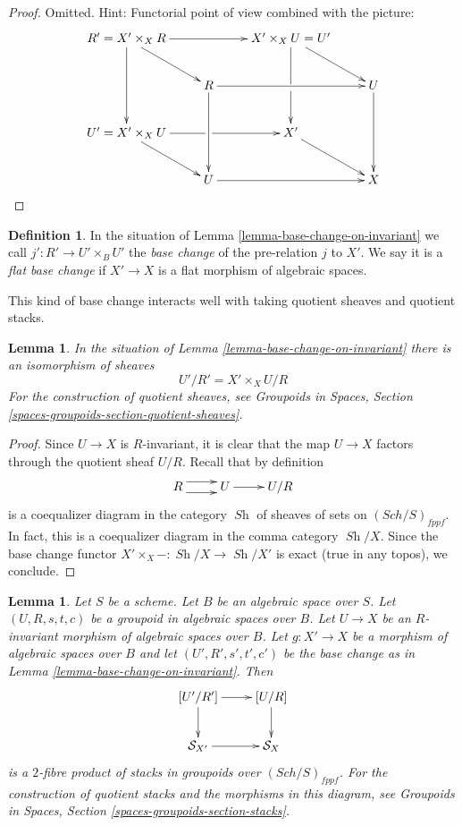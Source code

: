 \documentclass{stacks-project}
\theoremstyle{plain}
\newtheorem{lemma}[subsection]{Lemma}
\theoremstyle{definition}
\newtheorem{definition}[subsection]{Definition}
\theoremstyle{remark}
\numberwithin{equation}{subsection}
\def\Sch{\mathit{Sch}}
\def\Sh{\mathop{\mathit{Sh}}\nolimits}
\begin{document}
\begin{proof}
Omitted. Hint: Functorial point of view combined with the picture:
$$
\xymatrix{
R' = X' \times_X R \ar[dd] \ar[rr] \ar[rd] & &
X' \times_X U = U' \ar'[d][dd] \ar[rd] \\
& R \ar[dd] \ar[rr] & & U \ar[dd] \\
U' = X' \times_X U \ar'[r][rr] \ar[rd] & & X' \ar[rd] \\
& U \ar[rr] & & X
}
$$
\end{proof}

\begin{definition}
\label{definition-base-change}
In the situation of Lemma \ref{lemma-base-change-on-invariant}
we call $j' : R' \to U' \times_B U'$ the {\it base change} of the pre-relation
$j$ to $X'$. We say it is a {\it flat base change} if $X' \to X$ is a flat
morphism of algebraic spaces.
\end{definition}

\noindent
This kind of base change interacts well with taking quotient sheaves
and quotient stacks.

\begin{lemma}
\label{lemma-base-change-quotient-sheaf}
In the situation of Lemma \ref{lemma-base-change-on-invariant}
there is an isomorphism of sheaves
$$
U'/R' = X' \times_X U/R
$$
For the construction of quotient sheaves, see
Groupoids in Spaces, Section \ref{spaces-groupoids-section-quotient-sheaves}.
\end{lemma}

\begin{proof}
Since $U \to X$ is $R$-invariant, it is clear that the map
$U \to X$ factors through the quotient sheaf $U/R$.
Recall that by definition
$$
\xymatrix{
R \ar@<1ex>[r] \ar@<-1ex>[r] &
U \ar[r] &
U/R
}
$$
is a coequalizer diagram in the category $\Sh$ of sheaves of sets on
$(\Sch/S)_{fppf}$. In fact, this is a coequalizer diagram in the
comma category $\Sh/X$. Since the base change functor
$X' \times_X - : \Sh/X \to \Sh/X'$ is exact (true in any topos),
we conclude.
\end{proof}

\begin{lemma}
\label{lemma-base-change-quotient-stack}
Let $S$ be a scheme. Let $B$ be an algebraic space over $S$.
Let $(U, R, s, t, c)$ be a groupoid in algebraic spaces over $B$.
Let $U \to X$ be an $R$-invariant morphism of algebraic spaces over
$B$. Let $g : X' \to X$ be a morphism of algebraic spaces over $B$
and let $(U', R', s', t', c')$ be the base change as in
Lemma \ref{lemma-base-change-on-invariant}. Then
$$
\xymatrix{
[U'/R'] \ar[r] \ar[d] & [U/R] \ar[d] \\
\mathcal{S}_{X'} \ar[r] & \mathcal{S}_X
}
$$
is a $2$-fibre product of stacks in groupoids over $(\Sch/S)_{fppf}$.
For the construction of quotient stacks and the morphisms in this
diagram, see
Groupoids in Spaces, Section \ref{spaces-groupoids-section-stacks}.
\end{lemma}
\end{document}
